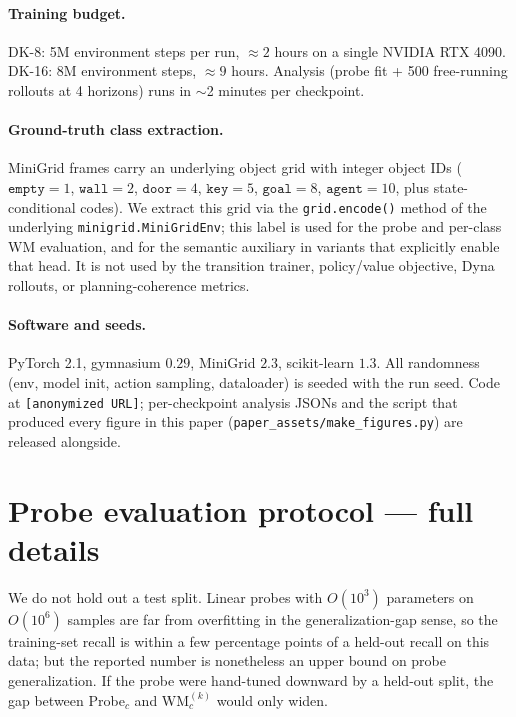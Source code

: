 \documentclass{article}
\begin{document}
\paragraph{Training budget.}
DK-8: 5M environment steps per run, $\approx 2$ hours on a single NVIDIA RTX 4090. DK-16: 8M environment steps, $\approx 9$ hours. Analysis (probe fit + 500 free-running rollouts at 4 horizons) runs in $\sim$2 minutes per checkpoint.

\paragraph{Ground-truth class extraction.}
MiniGrid frames carry an underlying object grid with integer object IDs ($\texttt{empty}{=}1$, $\texttt{wall}{=}2$, $\texttt{door}{=}4$, $\texttt{key}{=}5$, $\texttt{goal}{=}8$, $\texttt{agent}{=}10$, plus state-conditional codes). We extract this grid via the \texttt{grid.encode()} method of the underlying \texttt{minigrid.MiniGridEnv}; this label is used for the probe and per-class WM evaluation, and for the semantic auxiliary in variants that explicitly enable that head. It is not used by the transition trainer, policy/value objective, Dyna rollouts, or planning-coherence metrics.

\paragraph{Software and seeds.}
PyTorch 2.1, gymnasium $0.29$, MiniGrid $2.3$, scikit-learn $1.3$. All randomness (env, model init, action sampling, dataloader) is seeded with the run seed. Code at \texttt{[anonymized URL]}; per-checkpoint analysis JSONs and the script that produced every figure in this paper (\texttt{paper\_assets/make\_figures.py}) are released alongside.

\section{Probe evaluation protocol --- full details}\label{app:probe-protocol}

We do not hold out a test split. Linear probes with $O(10^3)$ parameters on $O(10^6)$ samples are far from overfitting in the generalization-gap sense, so the training-set recall is within a few percentage points of a held-out recall on this data; but the reported number is nonetheless an upper bound on probe generalization. If the probe were hand-tuned downward by a held-out split, the gap between Probe$_c$ and WM$_c^{(k)}$ would only widen.
\end{document}
